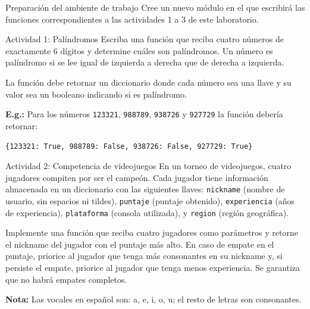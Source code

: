 \documentclass{ip-lab}
\begin{document}
\maketitle

\begin{sectionbox}{Preparación del ambiente de trabajo}
  Cree un nuevo módulo en el que escribirá las funciones correspondientes a las actividades 1 a 3 de este laboratorio.
\end{sectionbox}

\begin{sectionbox}{Actividad 1: Palíndromos}
Escriba una función que reciba cuatro números de exactamente 6 dígitos y determine cuáles son palíndromos. Un número es palíndromo si se lee igual de izquierda a derecha que de derecha a izquierda.

La función debe retornar un diccionario donde cada número sea una llave y su valor sea un booleano indicando si es palíndromo.

\textbf{E.g.:} Para los números \texttt{123321}, \texttt{988789}, \texttt{938726} y \texttt{927729} la función debería retornar:

\texttt{\{123321: True, 988789: False, 938726: False, 927729: True\}}
\end{sectionbox}

\begin{sectionbox}{Actividad 2: Competencia de videojuegos}
En un torneo de videojuegos, cuatro jugadores compiten por ser el campeón. Cada jugador tiene información almacenada en un diccionario con las siguientes llaves: \texttt{\textquotedbl nickname\textquotedbl} (nombre de usuario, sin espacios ni tildes), \texttt{\textquotedbl puntaje\textquotedbl} (puntaje obtenido), \texttt{\textquotedbl experiencia\textquotedbl} (años de experiencia), \texttt{\textquotedbl plataforma\textquotedbl} (consola utilizada), y \texttt{\textquotedbl region\textquotedbl} (región geográfica).

Implemente una función que reciba cuatro jugadores como parámetros y retorne el nickname del jugador con el puntaje más alto. En caso de empate en el puntaje, priorice al jugador que tenga más consonantes en su nickname y, si persiste el empate, priorice al jugador que tenga menos experiencia. Se garantiza que no habrá empates completos.

\textbf{Nota:} Las vocales en español son: a, e, i, o, u; el resto de letras son consonantes.
\end{sectionbox}

\pagebreak
\end{document}

